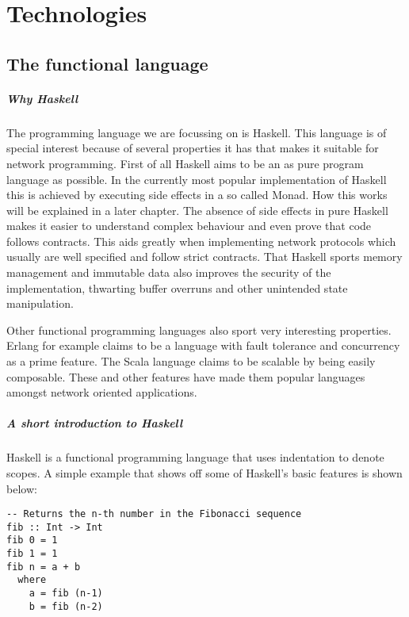 \chapter{Technologies}
\section{The functional language}
\paragraph{Why Haskell}
The programming language we are focussing on is Haskell.
This language is of special interest because of several properties it has that makes it suitable for network programming.
First of all Haskell aims to be an as pure program language as possible.
In the currently most popular implementation of Haskell this is achieved by executing side effects in a so called Monad.
How this works will be explained in a later chapter.
The absence of side effects in pure Haskell makes it easier to understand complex behaviour and even prove that code follows contracts.
This aids greatly when implementing network protocols which usually are well specified and follow strict contracts.
That Haskell sports memory management and immutable data also improves the security of the implementation, thwarting buffer overruns and other unintended state manipulation.

Other functional programming languages also sport very interesting properties.
Erlang for example claims to be a language with fault tolerance and concurrency as a prime feature\cite{armstrong_concurrent_1993}.
The Scala language claims to be scalable by being easily composable\cite{odersky_overview_????}.
These and other features have made them popular languages amongst network oriented applications. %
\paragraph{A short introduction to Haskell}
Haskell is a functional programming language that uses indentation to denote scopes. A simple example that shows off some of Haskell's basic features is shown below:

\begin{lstlisting}[caption={Fibonacci}]
-- Returns the n-th number in the Fibonacci sequence
fib :: Int -> Int
fib 0 = 1
fib 1 = 1
fib n = a + b
  where
    a = fib (n-1)
    b = fib (n-2)
\end{lstlisting}

